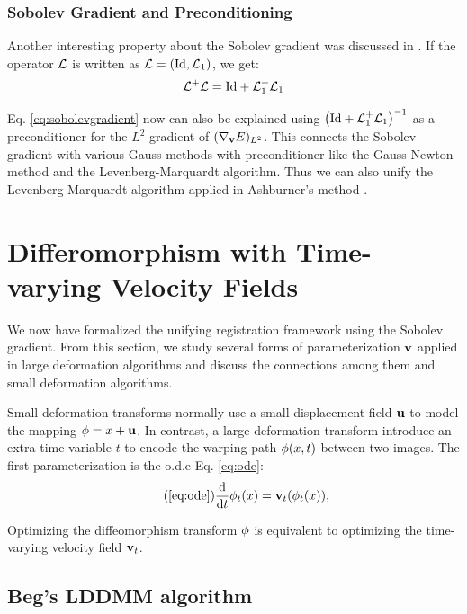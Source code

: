 \documentclass[letterpaper,12pt]{article}
\begin{document}
\subsubsection{Sobolev Gradient and Preconditioning}
\label{sec:sobolevprecondition}

Another interesting property about the Sobolev gradient was discussed in \cite{Zikic2010}. If the operator $\mathcal{L}$ is written as $\mathcal{L} = (\text{Id}, \mathcal{L}_1)$, we get:
\begin{align}
\mathcal{L}^+\mathcal{L} = \text{Id} + \mathcal{L}_1^+ \mathcal{L}_1
\end{align}

Eq. \ref{eq:sobolevgradient} now can also be explained using $\left(
  \text{Id} + \mathcal{L}_1^+ \mathcal{L}_1 \right)^{-1}$ as a preconditioner for the
$L^2$ gradient of $(\nabla_{\mathbf{v}}E)_{L^2}$. This connects the Sobolev
gradient with various Gauss methods with preconditioner like the
Gauss-Newton method and the Levenberg-Marquardt algorithm. Thus we can also unify the Levenberg-Marquardt algorithm applied in Ashburner's method \cite{Ashburner2007}.


\section{Differomorphism with Time-varying Velocity Fields}
\label{sec:lddmm}

We now have formalized the unifying registration framework using the Sobolev gradient. From this section, we study several forms of parameterization $\mathbf{v}$ applied in large deformation algorithms and discuss the connections among them and small deformation algorithms.

Small deformation transforms normally use a small displacement field $\mathbf{u}$ to model the mapping $\phi = x + \mathbf{u}$. In contrast, a large deformation transform introduce an extra time variable $t$ to encode the warping path $\phi(x,t)$ between two images. The first parameterization is the o.d.e Eq. \ref{eq:ode}:
\begin{align}
\tag{\ref{eq:ode}}
\frac{\dd}{\dd t} \myphi_t(x) = \v_t(\myphi_t(x)), 
\end{align}

Optimizing the diffeomorphism transform $\phi$ is equivalent to optimizing the time-varying velocity field $\mathbf{v}_t$. 

\subsection{Beg's LDDMM algorithm}
\end{document}
